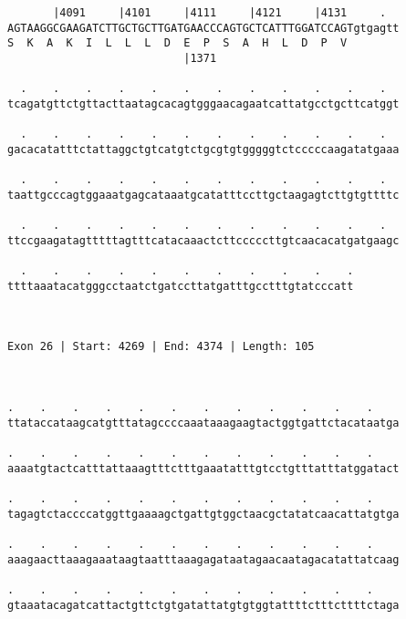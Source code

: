 \documentclass{article}
\begin{document}
\begin{Verbatim}
       |4091     |4101     |4111     |4121     |4131     .  
AGTAAGGCGAAGATCTTGCTGCTTGATGAACCCAGTGCTCATTTGGATCCAGTgtgagtt
S  K  A  K  I  L  L  L  D  E  P  S  A  H  L  D  P  V        
                           |1371                            
  
  .    .    .    .    .    .    .    .    .    .    .    .  
tcagatgttctgttacttaatagcacagtgggaacagaatcattatgcctgcttcatggt
                                                            
  .    .    .    .    .    .    .    .    .    .    .    .  
gacacatatttctattaggctgtcatgtctgcgtgtgggggtctcccccaagatatgaaa
                                                            
  .    .    .    .    .    .    .    .    .    .    .    .  
taattgcccagtggaaatgagcataaatgcatatttccttgctaagagtcttgtgttttc
                                                            
  .    .    .    .    .    .    .    .    .    .    .    .  
ttccgaagatagtttttagtttcatacaaactcttcccccttgtcaacacatgatgaagc
                                                            
  .    .    .    .    .    .    .    .    .    .    .
ttttaaatacatgggcctaatctgatccttatgatttgcctttgtatcccatt
                                                     
                                                     
 
Exon 26 | Start: 4269 | End: 4374 | Length: 105



.    .    .    .    .    .    .    .    .    .    .    .    
ttataccataagcatgtttatagccccaaataaagaagtactggtgattctacataatga
                                                            
.    .    .    .    .    .    .    .    .    .    .    .    
aaaatgtactcatttattaaagtttctttgaaatatttgtcctgtttatttatggatact
                                                            
.    .    .    .    .    .    .    .    .    .    .    .    
tagagtctaccccatggttgaaaagctgattgtggctaacgctatatcaacattatgtga
                                                            
.    .    .    .    .    .    .    .    .    .    .    .    
aaagaacttaaagaaataagtaatttaaagagataatagaacaatagacatattatcaag
                                                            
.    .    .    .    .    .    .    .    .    .    .    .    
gtaaatacagatcattactgttctgtgatattatgtgtggtattttctttcttttctaga
                                                            

\end{Verbatim}
\end{document}
